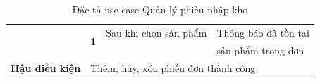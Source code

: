 \documentclass[../DoAn.tex]{subfiles}
\begin{document}
\begin{table}[H]
\begin{tabular}{|l|c|l|l|}
                                                 & \multirow{2}{*}{\textbf{1}}                                        & Sau khi chọn sản phẩm                     & Thông báo đã tồn tại                            \\
                                                 &                                                                    &                                           & sản phẩm trong đơn                              \\ \hline
        \textbf{Hậu điều kiện}                   & \multicolumn{3}{l|}{Thêm, hủy, xóa phiếu đơn thành công}                                                                                                         \\ \hline
    \end{tabular}
    \caption{Đặc tả use case Quản lý phiếu nhập kho}
    \label{table:uc-importreport-manage}
\end{table}
\end{document}
